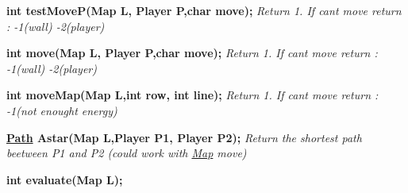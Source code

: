 {\bfseries int test\+Move\+P(\+Map L, Player P,char move);} {\itshape Return 1. If can\textquotesingle{}t move return \+: -\/1(wall) -\/2(player)}

{\bfseries int move(\+Map L, Player P,char move);} {\itshape Return 1. If can\textquotesingle{}t move return \+: -\/1(wall) -\/2(player)}

{\bfseries int move\+Map(\+Map L,int row, int line);} {\itshape Return 1. If can\textquotesingle{}t move return \+: -\/1(not enought energy)}

{\bfseries \hyperlink{struct_path}{Path} Astar(\+Map L,\+Player P1, Player P2);} {\itshape Return the shortest path beetween P1 and P2 (could work with \hyperlink{struct_map}{Map} move)}

{\bfseries int evaluate(\+Map L);} 
